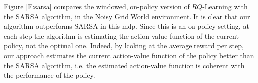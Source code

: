 Figure \ref{F:sarsa} compares the windowed, on-policy version of $RQ$-Learning with the SARSA algorithm, in the Noisy Grid World environment. It is clear that our algorithm outperforms SARSA in this \gls{mdp}.
Since this is an on-policy setting, at each step the algorithm is estimating the action-value function of the current policy, not the optimal one. Indeed, by looking at the average reward per step, our approach estimates the current action-value function of the policy better than the SARSA algorithm, i.e. the estimated action-value function is coherent with the performance of the policy.
